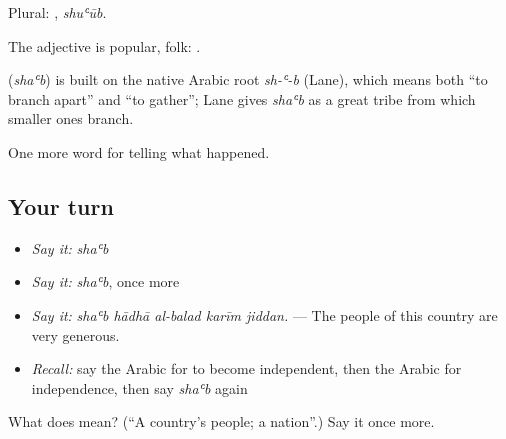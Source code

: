 Plural: , \emph{shuʿūb}.

The adjective  is popular, folk:  .

\begin{cousinweb}
\textbf{} (\emph{shaʿb}) is built on the native Arabic root \emph{sh-ʿ-b} (Lane), which means both \textquotedblleft{}to branch apart\textquotedblright{} and \textquotedblleft{}to gather\textquotedblright{}; Lane gives \emph{shaʿb} as a great tribe from which smaller ones branch.
\end{cousinweb}

\begin{grammarlens}[title={What you've built}]
One more word for telling what happened.
\end{grammarlens}

\subsection*{Your turn}
\begin{itemize}
\raggedright
  \item \emph{Say it:} \emph{shaʿb}
  \item \emph{Say it:} \emph{shaʿb}, once more
  \item \emph{Say it:} \emph{shaʿb hādhā al-balad karīm jiddan.} — The people of this country are very generous.
  \item \emph{Recall:} say the Arabic for to become independent, then the Arabic for independence, then say \emph{shaʿb} again
\end{itemize}

\begin{tcolorbox}[breakable,colback=teal!4,colframe=teal!35!black,title={Before you move on}]
What does  mean? (\textquotedblleft{}A country’s people; a nation\textquotedblright{}.) Say it once more.
\end{tcolorbox}
